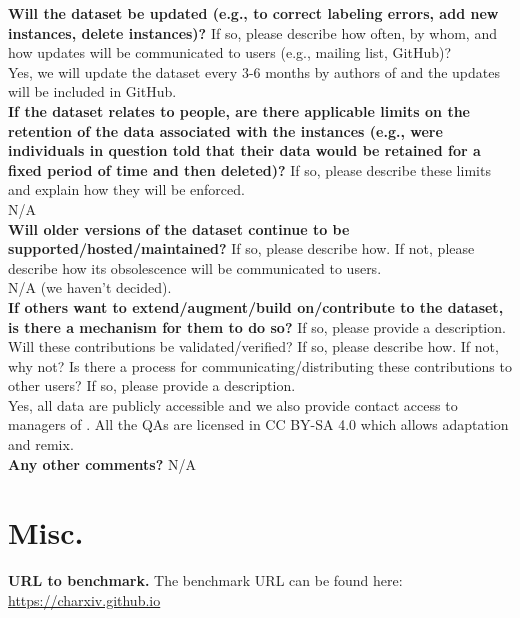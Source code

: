     \textcolor{\sectioncolor}{\textbf{Will the dataset be updated (e.g., to correct labeling errors, add new
    instances, delete instances)?
    }
    If so, please describe how often, by whom, and how updates will be
    communicated to users (e.g., mailing list, GitHub)?
    } \\
    Yes, we will update the dataset every 3-6 months by authors of \ours{} and the updates will be included in GitHub. \\

    \textcolor{\sectioncolor}{\textbf{If the dataset relates to people, are there applicable limits on the
    retention of the data associated with the instances (e.g., were individuals
    in question told that their data would be retained for a fixed period of
    time and then deleted)?
    }
    If so, please describe these limits and explain how they will be enforced.
    } \\
    N/A \\

    \textcolor{\sectioncolor}{\textbf{Will older versions of the dataset continue to be
    supported/hosted/maintained?
    }
    If so, please describe how. If not, please describe how its obsolescence
    will be communicated to users.
    } \\
    N/A (we haven't decided). \\

    \textcolor{\sectioncolor}{\textbf{If others want to extend/augment/build on/contribute to the dataset, is
    there a mechanism for them to do so?
    }
    If so, please provide a description. Will these contributions be
    validated/verified? If so, please describe how. If not, why not? Is there a
    process for communicating/distributing these contributions to other users?
    If so, please provide a description.
    } \\
    Yes, all data are publicly accessible and we also provide contact access to managers of \ours{}. All the QAs are licensed in CC BY-SA 4.0 which allows adaptation and remix.\\

    \textcolor{\sectioncolor}{\textbf{Any other comments?
    }} N/A \\

\vspace{-2ex}
\section{Misc.}
\textbf{URL to benchmark.} The benchmark URL can be found here: \url{https://charxiv.github.io}

